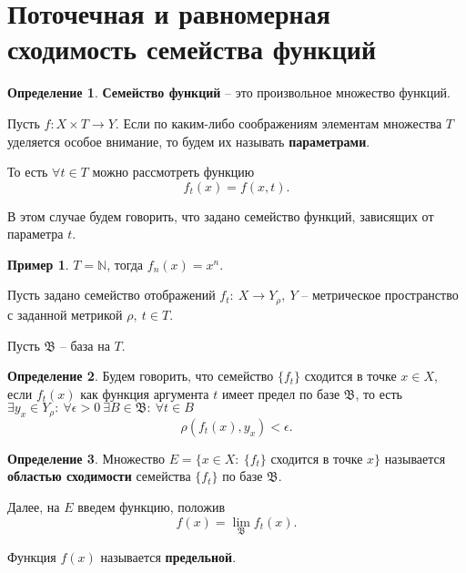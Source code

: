 \documentclass{report}
\theoremstyle{definition}
\newtheorem{definition}{Определение}[section]
\newtheorem{example}{Пример}
\begin{document}
\section{Поточечная и равномерная сходимость семейства функций}

\begin{definition}
  \textbf{Семейство функций} -- это произвольное множество функций.

  Пусть $f:X\times T \rightarrow Y$. Если по каким-либо соображениям элементам множества $T$ уделяется особое внимание, то будем их называть \textbf{параметрами}.

  То есть $\forall t \in T$ можно рассмотреть функцию
  \begin{equation*}
    f_t(x) = f(x,t).
  \end{equation*}

  В этом случае будем говорить, что задано семейство функций, зависящих от параметра $t$.
\end{definition}

\begin{example}
  $T = \mathbb{N}$, тогда $f_n(x) = x^n$.
\end{example}

Пусть задано семейство отображений $f_t: \ X\rightarrow Y_\rho, \ Y$ -- метрическое пространство с заданной метрикой $\rho, \ t \in T$.

Пусть $\mathfrak{B}$ -- база на $T$.

\begin{definition}
  Будем говорить, что семейство $\{f_t\}$ сходится в точке $x \in X$, если $f_t(x)$ как функция аргумента $t$ имеет предел по базе $\mathfrak{B}$, то есть $\exists y_x \in Y_\rho: \ \forall \epsilon > 0 \ \exists B \in \mathfrak{B}: \ \forall t \in B$
  \begin{equation*}
    \rho(f_t(x),y_x) < \epsilon.
  \end{equation*}
\end{definition}

\begin{definition}
  Множество $E = \{x \in X : \ \{f_t\}$ сходится в точке $x\}$ называется \textbf{областью сходимости} семейства $\{f_t\}$ по базе $\mathfrak{B}$.

  Далее, на $E$ введем функцию, положив
  \begin{equation*}
    f(x) = \underset{\mathfrak{B}}{\lim}f_t(x).
  \end{equation*}

  Функция $f(x)$ называется \textbf{предельной}.
\end{definition}
\end{document}
